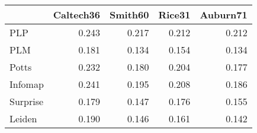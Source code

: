 \begin{tabular}{lrrrr}
\toprule
{} & Caltech36 & Smith60 & Rice31 & Auburn71 \\
\midrule
PLP      &     0.243 &   0.217 &  0.212 &    0.212 \\
PLM      &     0.181 &   0.134 &  0.154 &    0.134 \\
Potts    &     0.232 &   0.180 &  0.204 &    0.177 \\
Infomap  &     0.241 &   0.195 &  0.208 &    0.186 \\
Surprise &     0.179 &   0.147 &  0.176 &    0.155 \\
Leiden   &     0.190 &   0.146 &  0.161 &    0.142 \\
\bottomrule
\end{tabular}
